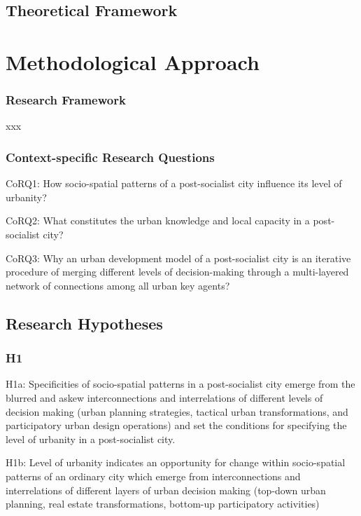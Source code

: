 \documentclass[11pt]{report}
\begin{document}
\section{Theoretical Framework}



\chapter{Methodological Approach}


\subsection{Research Framework}

xxx

\subsection{Context-specific Research Questions}


CoRQ1: How socio-spatial patterns of a post-socialist city influence its level of urbanity?

CoRQ2: What constitutes the urban knowledge and local capacity in a post-socialist city?

CoRQ3: Why an urban development model of a post-socialist city is an iterative procedure of
merging different levels of decision-making through a multi-layered network of connections among all urban key agents?

\section{Research Hypotheses}
\subsection{H1}

H1a: Specificities of socio-spatial patterns in a post-socialist city emerge from the blurred and askew interconnections and 
interrelations  of  different  levels  of  decision  making  (urban  planning  strategies,  tactical  urban  transformations,  and 
participatory urban design operations) and set the conditions for specifying the level of urbanity in a post-socialist city. 

H1b: Level of urbanity indicates an opportunity for change within socio-spatial patterns of an ordinary city which emerge from interconnections and interrelations  of  different  layers  of urban decision  making (top-down urban planning, real estate transformations, bottom-up participatory activities)
\end{document}
